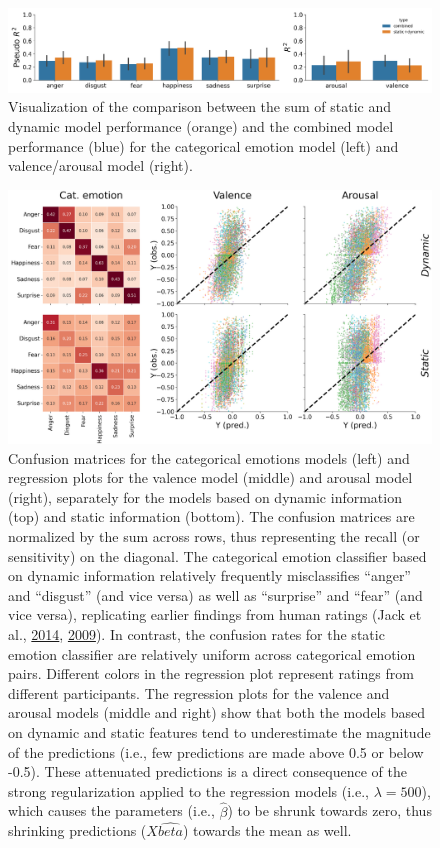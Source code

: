 \documentclass[11pt,american,]{memoir} %
\begin{document}
\begin{figure}
\centering
\includegraphics{_bookdown_files/static-vs-dynamic-files/figures/figure_S4.pdf}
\caption{\label{fig:fig-svsd-S4}Visualization of the comparison between the sum of static and dynamic model performance (orange) and the combined model performance (blue) for the categorical emotion model (left) and valence/arousal model (right).}
\end{figure}



\begin{figure}
\centering
\includegraphics{_bookdown_files/static-vs-dynamic-files/figures/figure_S5.pdf}
\caption{\label{fig:fig-svsd-S5}Confusion matrices for the categorical emotions models (left) and regression plots for the valence model (middle) and arousal model (right), separately for the models based on dynamic information (top) and static information (bottom). The confusion matrices are normalized by the sum across rows, thus representing the recall (or sensitivity) on the diagonal. The categorical emotion classifier based on dynamic information relatively frequently misclassifies ``anger'' and ``disgust'' (and vice versa) as well as ``surprise'' and ``fear'' (and vice versa), replicating earlier findings from human ratings (Jack et al., \protect\hyperlink{ref-Jack2014-ku}{2014}, \protect\hyperlink{ref-Jack2009-yy}{2009}). In contrast, the confusion rates for the static emotion classifier are relatively uniform across categorical emotion pairs. Different colors in the regression plot represent ratings from different participants. The regression plots for the valence and arousal models (middle and right) show that both the models based on dynamic and static features tend to underestimate the magnitude of the predictions (i.e., few predictions are made above 0.5 or below -0.5). These attenuated predictions is a direct consequence of the strong regularization applied to the regression models (i.e., \(\lambda = 500\)), which causes the parameters (i.e., \(\hat{\beta}\)) to be shrunk towards zero, thus shrinking predictions (\(X\hat{beta}\)) towards the mean as well.}
\end{figure}
\end{document}
